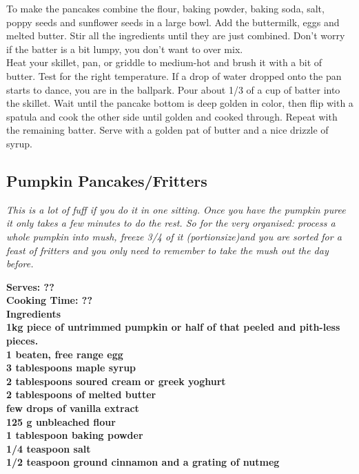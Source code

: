 \documentclass[18pt, oneside]{book}
\begin{document}
To make the pancakes combine the flour, baking powder, baking soda, salt, poppy seeds and sunflower seeds in a large bowl. Add the buttermilk, eggs and melted butter. Stir all the ingredients until they are just combined. Don't worry if the batter is a bit lumpy, you don't want to over mix. \\

Heat your skillet, pan, or griddle to medium-hot and brush it with a bit of butter. Test for the right temperature. If a drop of water dropped onto the pan starts to dance, you are in the ballpark. Pour about 1/3 of a cup of batter into the skillet. Wait until the pancake bottom is deep golden in color, then flip with a spatula and cook the other side until golden and cooked through. Repeat with the remaining batter. Serve with a golden pat of butter and a nice drizzle of syrup. \\


\subsection{Pumpkin Pancakes/Fritters}

\textit{This is a lot of fuff if you do it in one sitting. Once you have the pumpkin puree it only takes a few minutes to do the rest. So for the very organised: process a whole pumpkin into mush, freeze 3/4 of it (portionsize)and you are sorted for a feast of fritters and you only need to remember to take the mush out the day before. \\}

\bf{Serves: ??} \\
\bf{Cooking Time: ??} \\

\bf{Ingredients} \normalfont \\ 
1kg piece of untrimmed pumpkin or half of that peeled and pith-less pieces. \\
1 beaten, free range egg \\
3 tablespoons maple syrup \\
2 tablespoons soured cream or greek yoghurt \\
2 tablespoons of melted butter \\
few drops of  vanilla extract \\
125 g unbleached flour \\
1 tablespoon baking powder \\
1/4 teaspoon salt \\
1/2 teaspoon ground cinnamon and a grating of nutmeg \\
\end{document}
